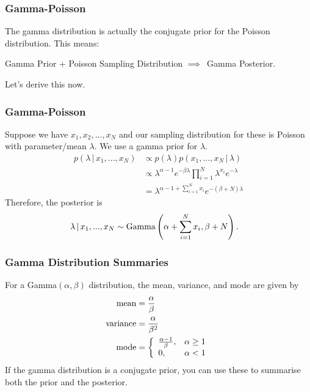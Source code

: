 \documentclass{beamer}
\newcommand{\given}{\,|\,}
\begin{document}
\begin{frame}
\frametitle{Gamma-Poisson}

The gamma distribution is actually the conjugate prior for the Poisson distribution. This means:

Gamma Prior + Poisson Sampling Distribution $\implies$~Gamma Posterior.

Let's derive this now.


\end{frame}


\begin{frame}
\frametitle{Gamma-Poisson}
Suppose we have $x_1, x_2, ..., x_N$ and our sampling distribution for these
is Poisson with parameter/mean $\lambda$. We use a gamma prior for $\lambda$.
\pause
\begin{align}
p(\lambda \given x_1, ..., x_N)
    &\propto p(\lambda)p(x_1, ..., x_N \given \lambda) \\
    &\propto \lambda^{\alpha-1}e^{-\beta \lambda}
            \prod_{i=1}^N \lambda^{x_i}e^{-\lambda} \\
    &= \lambda^{\alpha - 1 + \sum_{i=1}^N x_i}e^{-(\beta + N)\lambda}
\end{align}
Therefore, the posterior is
\begin{align}
\lambda \given x_1, ..., x_N &\sim
    \textnormal{Gamma}\left(\alpha + \sum_{i=1}^N x_i, \beta + N\right).
\end{align}



\end{frame}


\begin{frame}
\frametitle{Gamma Distribution Summaries}
For a Gamma$(\alpha, \beta)$ distribution, the mean, variance, and mode
are given by
\begin{align}
\textnormal{mean} &= \frac{\alpha}{\beta} \\
\textnormal{variance} &= \frac{\alpha}{\beta^2} \\
\textnormal{mode} &= \left\{
                        \begin{array}{lr}
                        \frac{\alpha-1}{\beta},& \alpha \geq 1 \\
                        0,& \alpha < 1
                        \end{array}
                    \right.
\end{align}
\pause
If the gamma distribution is a conjugate prior, you can use these to summarise
both the prior and the posterior.


\end{frame}
\end{document}
